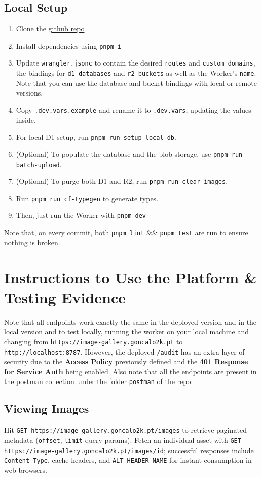 \documentclass[12pt]{article}
\begin{document}
\subsection{Local Setup}
\begin{enumerate}[leftmargin=*]
  \item Clone the \href{https://github.com/goncalo2k/image-gallery}{github repo}
  \item Install dependencies using \texttt{pnpm i}
  \item Update \texttt{wrangler.jsonc} to contain the desired \texttt{routes} and \texttt{custom\_domains}, the bindings for \texttt{d1\_databases} and \texttt{r2\_buckets} as well as the Worker's \texttt{name}. Note that you can use the database and bucket bindings with local or remote versions.
  \item Copy \texttt{.dev.vars.example} and rename it to \texttt{.dev.vars}, updating the values inside.
  \item For local D1 setup, run \texttt{pnpm run setup-local-db}.
  \item (Optional) To populate the database and the blob storage, use \texttt{pnpm run batch-upload}.
  \item (Optional) To purge both D1 and R2, run \texttt{pnpm run clear-images}.
  \item Run \texttt{pnpm run cf-typegen} to generate types.
  \item Then, just run the Worker with \texttt{pnpm dev}
\end{enumerate}

Note that, on every commit, both \texttt{pnpm lint} \&\& \texttt{pnpm test} are run to ensure nothing is broken.

\section{Instructions to Use the Platform \& Testing Evidence}
Note that all endpoints work exactly the same in the deployed version and in the local version and to test locally, running the worker on your local machine and changing from \texttt{https://image-gallery.goncalo2k.pt} to \texttt{http://localhost:8787}. However, the deployed \texttt{/audit} has an extra layer of security due to the \textbf{Access Policy} previously defined and the \textbf{401 Response for Service Auth} being enabled. Also note that all the endpoints are present in the postman collection under the folder \texttt{postman} of the repo.

\subsection{Viewing Images}
Hit \texttt{GET https://image-gallery.goncalo2k.pt/images} to retrieve paginated metadata (\texttt{offset}, \texttt{limit} query params). Fetch an individual asset with \texttt{GET https://image-gallery.goncalo2k.pt/images/{id}}; successful responses include \texttt{Content-Type}, cache headers, and \texttt{ALT\_HEADER\_NAME} for instant consumption in web browsers.
\end{document}
